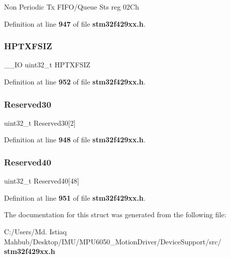 Non Periodic Tx F\+I\+F\+O/\+Queue Sts reg 02\+Ch 

Definition at line \textbf{ 947} of file \textbf{ stm32f429xx.\+h}.

\mbox{\label{structUSB__OTG__GlobalTypeDef_a928fd38284165374eb5aa85ed8d4e6cb}} 
\subsubsection{H\+P\+T\+X\+F\+S\+IZ}
{\footnotesize\ttfamily \+\_\+\+\_\+\+IO uint32\+\_\+t H\+P\+T\+X\+F\+S\+IZ}



Definition at line \textbf{ 952} of file \textbf{ stm32f429xx.\+h}.

\mbox{\label{structUSB__OTG__GlobalTypeDef_a577856159d58c037352ee10609b2a99c}} 
\subsubsection{Reserved30}
{\footnotesize\ttfamily uint32\+\_\+t Reserved30[2]}



Definition at line \textbf{ 948} of file \textbf{ stm32f429xx.\+h}.

\mbox{\label{structUSB__OTG__GlobalTypeDef_aea9d4b7970a55a4c87d8482ba1ed1b8b}} 
\subsubsection{Reserved40}
{\footnotesize\ttfamily uint32\+\_\+t Reserved40[48]}



Definition at line \textbf{ 951} of file \textbf{ stm32f429xx.\+h}.



The documentation for this struct was generated from the following file\+:\begin{DoxyCompactItemize}
\item 
C\+:/\+Users/\+Md. Istiaq Mahbub/\+Desktop/\+I\+M\+U/\+M\+P\+U6050\+\_\+\+Motion\+Driver/\+Device\+Support/src/\textbf{ stm32f429xx.\+h}\end{DoxyCompactItemize}
